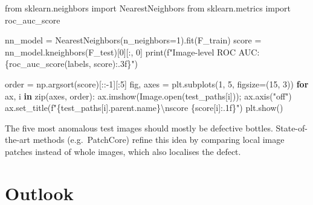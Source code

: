 \documentclass[
  letterpaper,
  DIV=11,
  numbers=noendperiod]{scrreprt}
\newenvironment{Shaded}{\begin{snugshade}}{\end{snugshade}}
\newcommand{\BuiltInTok}[1]{\textcolor[rgb]{0.00,0.23,0.31}{#1}}
\newcommand{\CharTok}[1]{\textcolor[rgb]{0.13,0.47,0.30}{#1}}
\newcommand{\ControlFlowTok}[1]{\textcolor[rgb]{0.00,0.23,0.31}{\textbf{#1}}}
\newcommand{\DecValTok}[1]{\textcolor[rgb]{0.68,0.00,0.00}{#1}}
\newcommand{\ImportTok}[1]{\textcolor[rgb]{0.00,0.46,0.62}{#1}}
\newcommand{\KeywordTok}[1]{\textcolor[rgb]{0.00,0.23,0.31}{\textbf{#1}}}
\newcommand{\NormalTok}[1]{\textcolor[rgb]{0.00,0.23,0.31}{#1}}
\newcommand{\OperatorTok}[1]{\textcolor[rgb]{0.37,0.37,0.37}{#1}}
\newcommand{\SpecialCharTok}[1]{\textcolor[rgb]{0.37,0.37,0.37}{#1}}
\newcommand{\SpecialStringTok}[1]{\textcolor[rgb]{0.13,0.47,0.30}{#1}}
\newcommand{\StringTok}[1]{\textcolor[rgb]{0.13,0.47,0.30}{#1}}
\begin{document}
\begin{Shaded}
\begin{Highlighting}[]
\ImportTok{from}\NormalTok{ sklearn.neighbors }\ImportTok{import}\NormalTok{ NearestNeighbors}
\ImportTok{from}\NormalTok{ sklearn.metrics }\ImportTok{import}\NormalTok{ roc\_auc\_score}

\NormalTok{nn\_model }\OperatorTok{=}\NormalTok{ NearestNeighbors(n\_neighbors}\OperatorTok{=}\DecValTok{1}\NormalTok{).fit(F\_train)}
\NormalTok{score }\OperatorTok{=}\NormalTok{ nn\_model.kneighbors(F\_test)[}\DecValTok{0}\NormalTok{][:, }\DecValTok{0}\NormalTok{]}
\BuiltInTok{print}\NormalTok{(}\SpecialStringTok{f"Image{-}level ROC AUC: }\SpecialCharTok{\{}\NormalTok{roc\_auc\_score(labels, score)}\SpecialCharTok{:.3f\}}\SpecialStringTok{"}\NormalTok{)}

\NormalTok{order }\OperatorTok{=}\NormalTok{ np.argsort(score)[::}\OperatorTok{{-}}\DecValTok{1}\NormalTok{][:}\DecValTok{5}\NormalTok{]}
\NormalTok{fig, axes }\OperatorTok{=}\NormalTok{ plt.subplots(}\DecValTok{1}\NormalTok{, }\DecValTok{5}\NormalTok{, figsize}\OperatorTok{=}\NormalTok{(}\DecValTok{15}\NormalTok{, }\DecValTok{3}\NormalTok{))}
\ControlFlowTok{for}\NormalTok{ ax, i }\KeywordTok{in} \BuiltInTok{zip}\NormalTok{(axes, order):}
\NormalTok{    ax.imshow(Image.}\BuiltInTok{open}\NormalTok{(test\_paths[i]))}\OperatorTok{;}\NormalTok{ ax.axis(}\StringTok{"off"}\NormalTok{)}
\NormalTok{    ax.set\_title(}\SpecialStringTok{f"}\SpecialCharTok{\{}\NormalTok{test\_paths[i]}\SpecialCharTok{.}\NormalTok{parent}\SpecialCharTok{.}\NormalTok{name}\SpecialCharTok{\}}\CharTok{\textbackslash{}n}\SpecialStringTok{score }\SpecialCharTok{\{}\NormalTok{score[i]}\SpecialCharTok{:.1f\}}\SpecialStringTok{"}\NormalTok{)}
\NormalTok{plt.show()}
\end{Highlighting}
\end{Shaded}

The five most anomalous test images should mostly be defective bottles.
State-of-the-art methods (e.g.~PatchCore) refine this idea by comparing
local image patches instead of whole images, which also localises the
defect.

\section{Outlook}\label{outlook}
\end{document}
